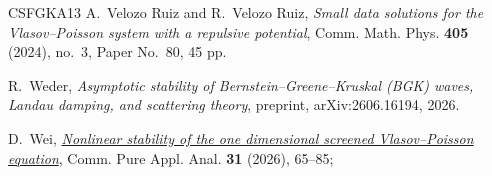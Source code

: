 \documentclass[10pt,reqno]{amsart}
\theoremstyle{definition}
\begin{document}
{\begin{thebibliography}{CSFGKA13}
A.~Velozo Ruiz and R.~Velozo Ruiz,
\emph{Small data solutions for the Vlasov--Poisson system with a repulsive potential},
Comm. Math. Phys. \textbf{405} (2024), no.~3, Paper No.~80, 45 pp.

R.~Weder,
\newblock \emph{Asymptotic stability of Bernstein--Greene--Kruskal (BGK) waves, Landau damping, and scattering theory},
\newblock preprint, arXiv:2606.16194, 2026.


D.~Wei,
\href{https://doi.org/10.3934/cpaa.2025054}{\emph{Nonlinear stability of the one dimensional screened Vlasov--Poisson equation}},
Comm. Pure Appl. Anal. \textbf{31} (2026), 65--85; 

\end{thebibliography}
\endgroup
\end{document}
